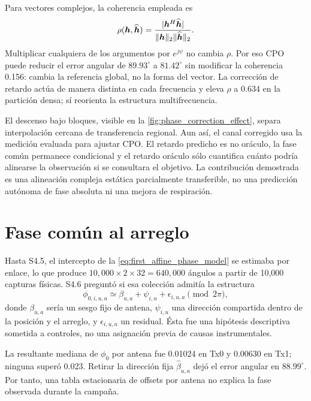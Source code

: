 Para vectores complejos, la coherencia empleada es
\begin{equation}
\rho(\bm{h},\widehat{\bm{h}})=
\frac{|\bm{h}^H\widehat{\bm{h}}|}
{\|\bm{h}\|_2\|\widehat{\bm{h}}\|_2}.
\label{eq:static_complex_coherence}
\end{equation}
Multiplicar cualquiera de los argumentos por $e^{j\psi}$ no cambia $\rho$. Por
eso CPO puede reducir el error angular de $89.93^\circ$ a $81.42^\circ$ sin
modificar la coherencia 0.156: cambia la referencia global, no la forma del vector.
La corrección de retardo actúa de manera distinta en cada frecuencia y eleva
$\rho$ a 0.634 en la partición densa; sí reorienta la estructura multifrecuencia.

El descenso bajo bloques, visible en la \cref{fig:phase_correction_effect}, separa
interpolación cercana de transferencia regional. Aun así, el canal corregido usa
la medición evaluada para ajustar CPO. El retardo predicho es no oráculo, la fase
común permanece condicional y el retardo oráculo sólo cuantifica cuánto podría
alinearse la observación si se consultara el objetivo. La contribución demostrada
es una alineación compleja estática parcialmente transferible, no una predicción
autónoma de fase absoluta ni una mejora de respiración.

\section{Fase común al arreglo}
\label{sec:common_array_phase}

Hasta S4.5, el intercepto de la \cref{eq:first_affine_phase_model} se estimaba por
enlace, lo que produce $10{,}000\times2\times32=640{,}000$ ángulos a partir de
10,000 capturas físicas. S4.6 preguntó si esa colección admitía la estructura
\begin{equation}
\phi_{0,i,u,a}\simeq
\beta_{u,a}+\psi_{i,u}+\epsilon_{i,u,a}\pmod{2\pi},
\label{eq:common_phase_decomposition}
\end{equation}
donde $\beta_{u,a}$ sería un sesgo fijo de antena, $\psi_{i,u}$ una dirección
compartida dentro de la posición y el arreglo, y $\epsilon_{i,u,a}$ un residual.
Ésta fue una hipótesis descriptiva sometida a controles, no una asignación previa
de causas instrumentales.

La resultante mediana de $\phi_0$ por antena fue 0.01024 en Tx0 y 0.00630 en Tx1;
ninguna superó 0.023. Retirar la dirección fija $\widehat\beta_{u,a}$ dejó el error
angular en $88.99^\circ$. Por tanto, una tabla estacionaria de offsets por antena
no explica la fase observada durante la campaña.


